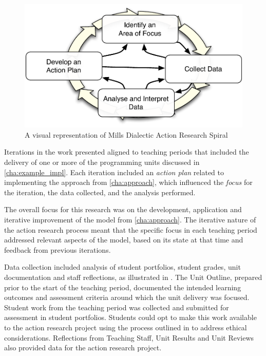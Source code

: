 \begin{figure}[htbp]
  \centering
  \includegraphics[width=0.7\columnwidth]{MillsSpiral}
  \caption{A visual representation of Mills \cite{Mills:2010} Dialectic Action Research Spiral}
  \label{fig:mills_spiral}
\end{figure}

Iterations in the work presented aligned to teaching periods that included the delivery of one or more of the programming units discussed in \cref{cha:example_impl}. Each iteration included an \emph{action plan} related to implementing the approach from \cref{cha:approach}, which influenced the \emph{focus} for the iteration, the data collected, and the analysis performed.

The overall focus for this research was on the development, application and iterative improvement of the model from \cref{cha:approach}. The iterative nature of the action research process meant that the specific focus in each teaching period addressed relevant aspects of the model, based on its state at that time and feedback from previous iterations. 

Data collection included analysis of student portfolios, student grades, unit documentation and staff reflections, as illustrated in . The Unit Outline, prepared prior to the start of the teaching period, documented the intended learning outcomes and assessment criteria around which the unit delivery was focused. Student work from the teaching period was collected and submitted for assessment in student portfolios. Students could opt to make this work available to the action research project using the process outlined in  to address ethical considerations. Reflections from Teaching Staff, Unit Results and Unit Reviews also provided data for the action research project.

